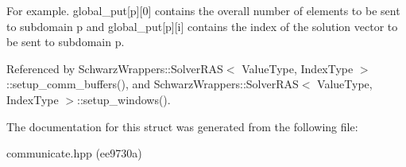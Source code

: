 For example. global\+\_\+put\mbox{[}p\mbox{]}\mbox{[}0\mbox{]} contains the overall number of elements to be sent to subdomain p and global\+\_\+put\mbox{[}p\mbox{]}\mbox{[}i\mbox{]} contains the index of the solution vector to be sent to subdomain p. 

Referenced by Schwarz\+Wrappers\+::\+Solver\+R\+A\+S$<$ Value\+Type, Index\+Type $>$\+::setup\+\_\+comm\+\_\+buffers(), and Schwarz\+Wrappers\+::\+Solver\+R\+A\+S$<$ Value\+Type, Index\+Type $>$\+::setup\+\_\+windows().



The documentation for this struct was generated from the following file\+:\begin{DoxyCompactItemize}
\item 
communicate.\+hpp (ee9730a)\end{DoxyCompactItemize}
